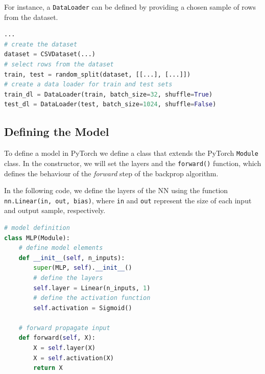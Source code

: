 \documentclass{tufte-handout}
\begin{document}
For instance, a \texttt{DataLoader} can be defined by providing a chosen sample of rows from the dataset.
\begin{lstlisting}[language=Python, caption=Python code for creating a DataLoader instance]
...
# create the dataset
dataset = CSVDataset(...)
# select rows from the dataset
train, test = random_split(dataset, [[...], [...]])
# create a data loader for train and test sets
train_dl = DataLoader(train, batch_size=32, shuffle=True)
test_dl = DataLoader(test, batch_size=1024, shuffle=False)
\end{lstlisting}
\subsection{Defining the Model}%
  \label{sub:Defining the Model}
  To define a model in PyTorch we define a class that extends the PyTorch \texttt{Module} class. In the constructor, we will set the layers and the \texttt{forward()} function, which defines the behaviour of the \textit{forward} step of the backprop algorithm.

  In the following code, we define the layers of the NN using the function \texttt{nn.Linear(in, out, bias)}, where \texttt{in} and \texttt{out} represent the size of each input and output sample, respectively. 
\begin{lstlisting}[language=python]
  # model definition
class MLP(Module):
    # define model elements
    def __init__(self, n_inputs):
        super(MLP, self).__init__()
        # define the layers
        self.layer = Linear(n_inputs, 1)
        # define the activation function 
        self.activation = Sigmoid()
 
    # forward propagate input
    def forward(self, X):
        X = self.layer(X)
        X = self.activation(X)
        return X
  \end{lstlisting}
\newpage
    

  
\end{document}
